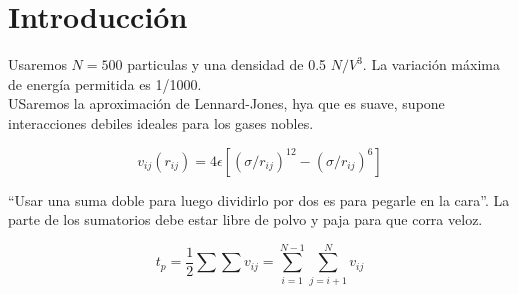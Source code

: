 
\chapter*{Introducción}

Usaremos $N=500$ particulas y una densidad de 0.5 $N/V^3$. La variación máxima de energía permitida es 1/1000. \\

USaremos la aproximación de Lennard-Jones, hya que es suave, supone interacciones debiles ideales para los gases nobles. 

\begin{equation} 
    v_{ij} (r_{ij}) = 4 \epsilon \left[ (\sigma /r_{ij})^{12}-(\sigma /r_{ij})^6 \right]
\end{equation}


``Usar una suma doble para luego dividirlo por dos es para pegarle en la cara''. La parte de los sumatorios debe estar libre de polvo y paja para que corra veloz. 

$$ t_p =  \frac{1}{2} \sum \sum v_{ij} = \sum_{i=1}^{N-1} \sum_{j=i+1}^N v_{ij} $$